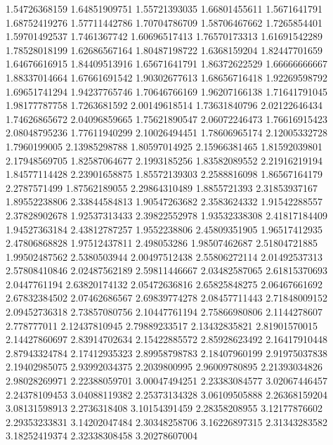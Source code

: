   1.54726368159    1.64851909751
  1.55721393035    1.66801455611
   1.5671641791    1.68752419276
  1.57711442786    1.70704786709
  1.58706467662     1.7265854401
  1.59701492537     1.7461367742
  1.60696517413    1.76570173313
  1.61691542289    1.78528018199
  1.62686567164    1.80487198722
   1.6368159204    1.82447701659
  1.64676616915    1.84409513916
  1.65671641791    1.86372622529
  1.66666666667    1.88337014664
  1.67661691542    1.90302677613
  1.68656716418    1.92269598792
  1.69651741294    1.94237765746
  1.70646766169    1.96207166138
  1.71641791045    1.98177787758
   1.7263681592    2.00149618514
  1.73631840796    2.02122646434
  1.74626865672    2.04096859665
  1.75621890547    2.06072246473
  1.76616915423    2.08048795236
  1.77611940299    2.10026494451
  1.78606965174    2.12005332728
   1.7960199005    2.13985298788
  1.80597014925    2.15966381465
  1.81592039801    2.17948569705
  1.82587064677     2.1993185256
  1.83582089552    2.21916219194
  1.84577114428    2.23901658875
  1.85572139303     2.2588816098
  1.86567164179     2.2787571499
  1.87562189055    2.29864310489
   1.8855721393    2.31853937167
  1.89552238806    2.33844584813
  1.90547263682     2.3583624332
  1.91542288557    2.37828902678
  1.92537313433    2.39822552978
  1.93532338308    2.41817184409
  1.94527363184    2.43812787257
   1.9552238806    2.45809351905
  1.96517412935    2.47806868828
  1.97512437811      2.498053286
  1.98507462687    2.51804721885
  1.99502487562     2.5380503944
  2.00497512438    2.55806272114
  2.01492537313    2.57808410846
  2.02487562189    2.59811446667
  2.03482587065    2.61815370693
   2.0447761194    2.63820174132
  2.05472636816    2.65825848275
  2.06467661692    2.67832384502
  2.07462686567    2.69839774278
  2.08457711443    2.71848009152
  2.09452736318    2.73857080756
  2.10447761194    2.75866980806
   2.1144278607      2.778777011
  2.12437810945    2.79889233517
  2.13432835821    2.81901570015
  2.14427860697    2.83914702634
  2.15422885572    2.85928623492
  2.16417910448    2.87943324784
  2.17412935323    2.89958798783
  2.18407960199    2.91975037838
  2.19402985075    2.93992034375
   2.2039800995    2.96009780895
  2.21393034826    2.98028269971
  2.22388059701    3.00047494251
  2.23383084577    3.02067446457
  2.24378109453    3.04088119382
  2.25373134328    3.06109505888
  2.26368159204    3.08131598913
   2.2736318408    3.10154391459
  2.28358208955    3.12177876602
  2.29353233831    3.14202047484
  2.30348258706    3.16226897315
  2.31343283582    3.18252419374
  2.32338308458    3.20278607004
